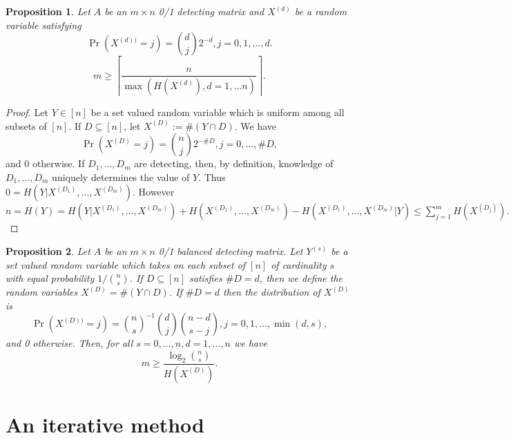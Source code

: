 \documentclass{article}
\newtheorem{proposition}{Proposition}
\begin{document}
\begin{proposition}
  Let $A$ be an $m \times n$ 0/1 detecting matrix and
  $X^{(d)}$ be a random variable satisfying
  \begin{displaymath}
    \Pr(X^{(d))} = j) = \binom{d}{j} 2^{-d}, j=0, 1, \dots, d.
  \end{displaymath}
  \begin{equation}
    \label{eq:pippenger}
    m \ge \left \lceil \frac{n}{\max(H(X^{(d)}), d = 1, \dots n)}
    \right \rceil.
  \end{equation}
\end{proposition}
\begin{proof}
  Let $Y \in [n]$ be a set valued random variable which is uniform
  among all subsets of $[n]$.  If $D \subseteq [n]$, let $X^{(D)} := \#(Y
  \cap D)$.  We have
  \begin{displaymath}
    \Pr(X^{(D)} = j) = \binom{n}{j} 2^{-\#D}, j=0, \dots, \#D,
  \end{displaymath}
  and 0 otherwise.  If $D_1, \dots, D_m$ are detecting, then, by
  definition, knowledge of $D_1, \dots, D_m$ uniquely determines the
  value of $Y$.  Thus $0 = H(Y | X^{(D_1)}, \dots, X^{(D_m)})$.
  However $n = H(Y) = H(Y | X^{(D_1)}, \dots, X^{(D_m)}) +
  H(X^{(D_1)}, \dots, X^{(D_m)}) - H(X^{(D_1)},
  \dots, X^{(D_m)} | Y) \le \sum_{j=1}^m H(X^{(D_j)}).$
\end{proof}
\begin{proposition}
  Let $A$ be an $m \times n$ 0/1 balanced detecting matrix.
  Let $Y^{(s)}$ be a set valued random variable which takes on each subset
  of $[n]$ of cardinality $s$ with equal probability $1/\binom{n}{s}$.
  If $D \subseteq [n]$ satisfies $\# D = d$, then we define the random
  variables $X^{(D)} = \# (Y \cap D)$.
  If $\#D = d$ then the distribution of $X^{(D)}$ is
  \begin{displaymath}
    \Pr(X^{(D))} = j) = \binom{n}{s}^{-1}\binom{d}{j}
    \binom{n-d}{s - j}, j=0, 1, \dots, \min(d,s),
  \end{displaymath}
  and 0 otherwise.
  Then, for all $s = 0, \dots, n, d=1, \dots, n$ we have
  \begin{equation}
    \label{eq:better}
    m \ge \frac{\log_2 \binom{n}{s}}{H(X^{(D)})}.
  \end{equation}
\end{proposition}
\section{An iterative method}
\label{sec:iterative}
\end{document}
